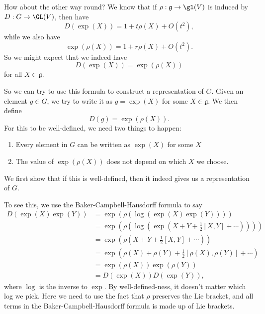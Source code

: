 \documentclass[a4paper]{article}
\begin{document}
How about the other way round? We know that if $\rho: \mathfrak{g} \to \gl(V)$ is induced by $D: G \to \GL(V)$, then have
\[
  D(\exp(X)) = 1 + t \rho(X) + O(t^2),
\]
while we also have
\[
  \exp(\rho(X)) = 1 + r \rho(X) + O(t^2).
\]
So we might expect that we indeed have
\[
  D(\exp(X)) = \exp(\rho(X))
\]
for all $X \in \mathfrak{g}$.

So we can try to use this formula to construct a representation of $G$. Given an element $g \in G$, we try to write it as $g = \exp(X)$ for some $X \in \mathfrak{g}$. We then define
\[
  D(g) = \exp(\rho(X)).
\]
For this to be well-defined, we need two things to happen:
\begin{enumerate}
  \item Every element in $G$ can be written as $\exp(X)$ for some $X$
  \item The value of $\exp(\rho(X))$ does not depend on which $X$ we choose.
\end{enumerate}
We first show that if this is well-defined, then it indeed gives us a representation of $G$.

To see this, we use the Baker-Campbell-Hausdorff formula to say
\begin{align*}
  D(\exp(X) \exp(Y)) &= \exp(\rho(\log(\exp(X)\exp(Y))))\\
  &= \exp\left(\rho\left(\log\left(\exp\left(X + Y + \frac{1}{2}[X, Y] + \cdots\right)\right)\right)\right)\\
  &= \exp\left(\rho\left(X + Y + \frac{1}{2}[X, Y] + \cdots\right)\right)\\
  &= \exp\left(\rho(X) + \rho(Y) + \frac{1}{2}[\rho(X), \rho(Y)] + \cdots\right)\\
  &= \exp(\rho(X))\exp(\rho(Y))\\
  &= D(\exp(X)) D(\exp(Y)),
\end{align*}
where $\log$ is the inverse to $\exp$. By well-defined-ness, it doesn't matter which log we pick. Here we need to use the fact that $\rho$ preserves the Lie bracket, and all terms in the Baker-Campbell-Hausdorff formula is made up of Lie brackets.
\end{document}
